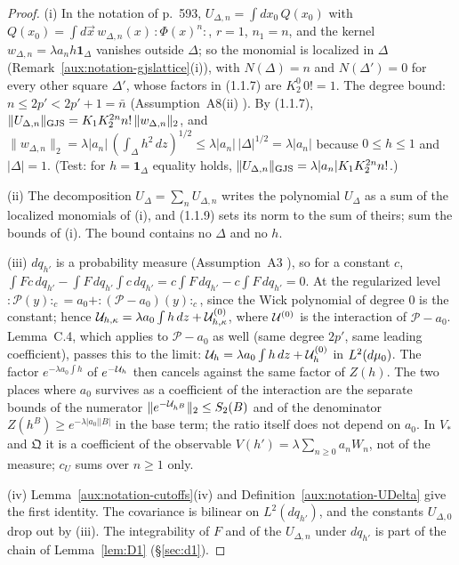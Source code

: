 \begin{proof}
(i) In the notation of p.~593, $U_{\Delta,n}=\int dx_0\,Q(x_0)$ with
$Q(x_0)=\int d\vec x\,w_{\Delta,n}(x)\,{:}\Phi(x)^n{:}$, $r=1$, $n_1=n$, and the kernel
$w_{\Delta,n}=\lambda a_nh\mathbf 1_\Delta$ vanishes outside $\Delta$; so the monomial is
localized in $\Delta$ (Remark~\ref{aux:notation-gjslattice}(i)), with $N(\Delta)=n$ and
$N(\Delta')=0$ for every other square $\Delta'$, whose factors in (1.1.7) are
$K_2^0\,0!=1$.  The degree bound: $n\le2p'<2p'+1=\bar n$ (Assumption~A8(ii)
\cite[p.~10]{R}).  By (1.1.7),
$\lVert U_{\Delta,n}\rVert_{\mathrm{GJS}}=K_1K_2^{2n}n!\,\|w_{\Delta,n}\|_2$, and
$\|w_{\Delta,n}\|_2=\lambda|a_n|\,(\int_\Delta h^2\,dz)^{1/2}\le\lambda|a_n|\,|\Delta|^{1/2}=
\lambda|a_n|$ because $0\le h\le1$ and $|\Delta|=1$.  (Test: for $h=\mathbf 1_\Delta$ equality
holds, $\lVert U_{\Delta,n}\rVert_{\mathrm{GJS}}=\lambda|a_n|K_1K_2^{2n}n!$.)

(ii) The decomposition $U_\Delta=\sum_nU_{\Delta,n}$ writes the polynomial $U_\Delta$ as a sum
of the localized monomials of (i), and (1.1.9) sets its norm to the sum of theirs; sum the
bounds of (i).  The bound contains no $\Delta$ and no $h$.

(iii) $dq_{h'}$ is a probability measure (Assumption~A3 \cite[p.~8]{R}), so for a constant $c$,
$\int Fc\,dq_{h'}-\int F\,dq_{h'}\int c\,dq_{h'}=c\int F\,dq_{h'}-c\int F\,dq_{h'}=0$.  At the
regularized level ${:}\mathscr P(y){:}_c=a_0+{:}(\mathscr P-a_0)(y){:}_c$, since the Wick
polynomial of degree $0$ is the constant; hence $\mathcal U_{h,\kappa}=\lambda a_0\int h\,dz+
\mathcal U^{(0)}_{h,\kappa}$, where $\mathcal U^{(0)}$ is the interaction of $\mathscr P-a_0$.  Lemma~C.4,
which applies to $\mathscr P-a_0$ as well (same degree $2p'$, same leading coefficient),
passes this to the limit: $\mathcal U_h=\lambda a_0\int h\,dz+\mathcal U^{(0)}_h$ in $L^2(d\mu_0)$.  The
factor $e^{-\lambda a_0\int h}$ of $e^{-\mathcal U_h}$ then cancels against the same factor of
$Z(h)$.  The two places where $a_0$ survives as a coefficient of the interaction are the separate
bounds of the numerator $\|e^{-\mathcal U_{h^B}}\|_2\le S_2(B)$ and of the denominator
$Z(h^B)\ge e^{-\lambda|a_0||B|}$ in the base term; the ratio itself does not depend on $a_0$.  In
$V_*$ and $\mathfrak Q$ it is a coefficient of the observable $V(h')=\lambda\sum_{n\ge0}a_nW_n$,
not of the measure; $c_U$ sums over $n\ge1$ only.

(iv) Lemma~\ref{aux:notation-cutoffs}(iv) and Definition~\ref{aux:notation-UDelta} give the
first identity.  The covariance is bilinear on $L^2(dq_{h'})$, and the constants
$U_{\Delta,0}$ drop out by (iii).  The integrability of $F$ and of the $U_{\Delta,n}$ under
$dq_{h'}$ is part of the chain of Lemma~\ref{lem:D1} (\S\ref{sec:d1}).
\end{proof}

